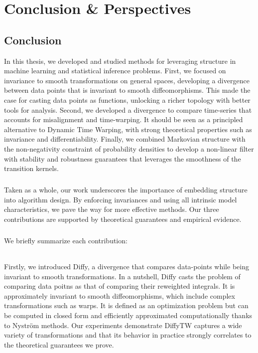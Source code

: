 \chapter{Conclusion \& Perspectives}\label{ch:conclusion}

\section{Conclusion}
In this thesis, we developed and studied methods for leveraging structure in machine learning and statistical inference problems. First, we focused on invariance to smooth transformations on general spaces, developing a divergence between data points that is invariant to smooth diffeomorphisms. This made the case for casting data points as functions, unlocking a richer topology with better tools for analysis.
Second, we developed a divergence to compare time-series that accounts for misalignment and time-warping. It should be seen as a principled alternative to Dynamic Time Warping, with strong theoretical properties such as invariance and differentiability.
Finally, we combined Markovian structure with the non-negativity constraint of probability densities to develop a non-linear filter with stability and robustness guarantees that leverages the smoothness of the transition kernels.

\paragraph{}
Taken as a whole, our work underscores the importance of embedding structure into algorithm design. By enforcing invariances and using all intrinsic model characteristics, we pave the way for more effective methods. Our three contributions are supported by theoretical guarantees and empirical evidence.

\paragraph{}
\noindent We briefly summarize each contribution:

\subparagraph{}
Firstly, we introduced Diffy, a divergence that compares data-points while being invariant to smooth transformations. In a nutshell, Diffy casts the problem of comparing data poitns as that of comparing their reweighted integrals. It is approximately invariant to smooth diffeomorphisms, which include complex transformations such as warps. It is defined as an optimization problem but can be computed in closed form and efficiently approximated computationally thanks to Nyström methods. Our experiments demonstrate DiffyTW captures a wide variety of transformations and that its behavior in practice strongly correlates to the theoretical guarantees we prove.

